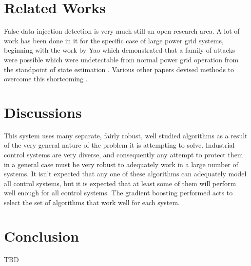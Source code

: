 \documentclass[10pt,twocolumn]{IEEEtran}
\begin{document}
\section{Related Works} \label{sec:related}
False data injection detection is very much still an open research area.
A lot of work has been done in it for the specific case of large power grid systems, beginning with the work by Yao which demonstrated that a family of attacks were possible which were undetectable from normal power grid operation from the standpoint of state estimation \cite{liu2011false}.
Various other papers devised methods to overcome this shortcoming \cite{bobba2010detecting}.

\section{Discussions}\label{sec:discussion}
This system uses many separate, fairly robust, well studied algorithms as a result of the very general nature of the problem it is attempting to solve.
Industrial control systems are very diverse, and consequently any attempt to protect them in a general case must be very robust to adequately work in a large number of systems.
It isn't expected that any one of these algorithms can adequately model all control systems, but it is expected that at least some of them will perform well enough for all control systems.
The gradient boosting performed acts to select the set of algorithms that work well for each system.

\section{Conclusion} \label{sec:conclusion}
TBD

\vspace{-0.08in}
\raggedright


\end{document}
